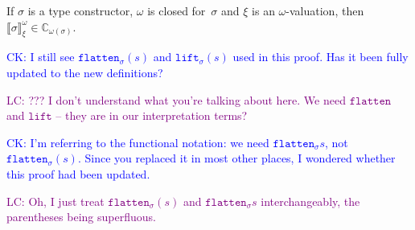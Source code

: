 \documentclass[runningheads,a4paper]{llncs}
\newcommand{\flatten}{\mathtt{flatten}}
\newcommand{\lift}{\mathtt{lift}}
\newcommand{\Cb}{\mathbb{C}}
\newcommand{\val}[3]{\ensuremath{\llbracket#1\rrbracket_{#2}^{#3}}}
\newcommand{\CK}[1]{\textcolor{blue}{CK: #1}}
\newcommand{\LC}[1]{\textcolor{purple}{LC: #1}}
\begin{document}
\begin{lemma}\label{lem_val_computable}
  If $\sigma$ is a type constructor, $\omega$ is closed for~$\sigma$
  and $\xi$ is an $\omega$-valuation, then $\val{\sigma}{\xi}{\omega}
  \in \Cb_{\omega(\sigma)}$.
\end{lemma}

\CK{I still see $\flatten_\sigma(s)$ and $\lift_\sigma(s)$ used in
this proof. Has it been fully updated to the new definitions?}

\LC{??? I don't understand what you're talking about here. We need
  $\flatten$ and $\lift$ -- they are in our interpretation terms?}

\CK{I'm referring to the functional notation: we need
$\flatten_\sigma s$, not $\flatten_\sigma(s)$.  Since you replaced
it in most other places, I wondered whether this proof had been
updated.}

\LC{Oh, I just treat $\flatten_\sigma(s)$ and $\flatten_\sigma s$
  interchangeably, the parentheses being superfluous.}
\end{document}
